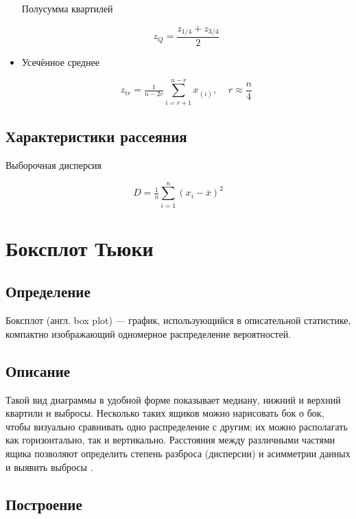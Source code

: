 \documentclass{article}
\begin{document}
\begin{itemize}
  Полусумма квартилей
  
  \begin{equation} \label{eq:zQ}
    z_Q = \dfrac{z_{1/4} + z_{3/4}}{2}
  \end{equation}
  
  \item Усечённое среднее
  
  \begin{equation} \label{eq:zTr}
    z_{tr} = \tfrac{1}{n-2r}\sum\limits_{i=r+1}^{n-r} x_{(i)}, \;\;\;\; r \approx \dfrac{n}{4}
  \end{equation}
  
\end{itemize}

\subsection{Характеристики рассеяния}

Выборочная дисперсия

\begin{equation}
    D = \tfrac{1}{n}\sum\limits_{i=1}^{n} (x_i - \overline{x})^2
\end{equation}

\section{Боксплот Тьюки}

\subsection{Определение}

Боксплот (англ. box plot) --- график, использующийся в описательной статистике, компактно изображающий одномерное распределение вероятностей.

\subsection{Описание}

Такой вид диаграммы в удобной форме показывает медиану, нижний и верхний квартили и выбросы. Несколько таких ящиков можно нарисовать бок о бок, чтобы визуально сравнивать одно распределение с другим; их можно располагать как горизонтально, так и вертикально. Расстояния между различными частями ящика позволяют определить степень разброса (дисперсии) и асимметрии данных и выявить выбросы \cite{s:boxplot}. 

\subsection{Построение}
\end{document}
